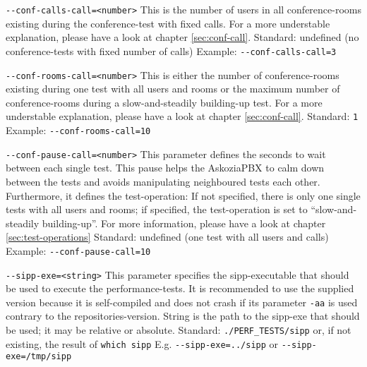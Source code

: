 \begin{description}
\item {\texttt{-{}-conf-calls-call=<number>}} \newline
This is the number of users in all conference-rooms existing during the conference-test with
fixed calls. 
For a more understable explanation, please have a look at chapter \ref{sec:conf-call}.
\newline Standard: undefined (no conference-tests with fixed number of calls)
\newline Example: \texttt{-{}-conf-calls-call=3}

\item {\texttt{-{}-conf-rooms-call=<number>}} \newline
This is either the number of conference-rooms existing during one test with all users and rooms
or the maximum number of conference-rooms during a slow-and-steadily building-up test.
For a more understable explanation, please have a look at chapter \ref{sec:conf-call}.
\newline Standard: \texttt{1} 
\newline Example: \texttt{-{}-conf-rooms-call=10}

\item {\texttt{-{}-conf-pause-call=<number>}} \newline
This parameter defines the seconds to wait between each single test.
This pause helps the AskoziaPBX to calm down between the tests and avoids manipulating
neighboured tests each other. Furthermore, it defines the test-operation: If not specified,
there is only one single tests with all users and rooms; if specified, the test-operation
is set to ``slow-and-steadily building-up''.
For more information, please have a look at chapter \ref{sec:test-operations}
\newline Standard: undefined (one test with all users and calls)
\newline Example: \texttt{-{}-conf-pause-call=10}

\item {\texttt{-{}-sipp-exe=<string>}} \newline
This parameter specifies the sipp-executable that should be used to execute the performance-tests.
It is recommended to use the supplied version because it is self-compiled and does not crash if
its parameter \texttt{-aa} is used contrary to the repositories-version. String is the path to
the sipp-exe that should be used; it may be relative or absolute.
\newline Standard: \texttt{./PERF\_TESTS/sipp} or, if not existing, the result of \texttt{which sipp}
\newline E.g. \texttt{-{}-sipp-exe=../sipp} or \texttt{-{}-sipp-exe=/tmp/sipp}


\end{description}
